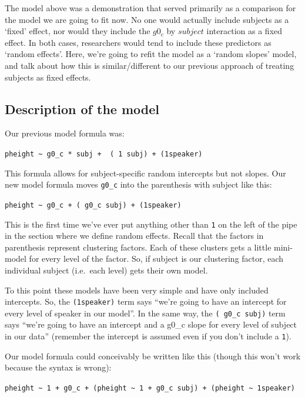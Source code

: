 \documentclass[
]{book}
\begin{document}
The model above was a demonstration that served primarily as a comparison for the model we are going to fit now. No one would actually include subjects as a `fixed' effect, nor would they include the \(g0_c\) by \(subject\) interaction as a fixed effect. In both cases, researchers would tend to include these predictors as `random effects'. Here, we're going to refit the model as a `random slopes' model, and talk about how this is similar/different to our previous approach of treating subjects as fixed effects.

\hypertarget{description-of-the-model-8}{%
\subsection{Description of the model}\label{description-of-the-model-8}}

Our previous model formula was:

\texttt{pheight\ \textasciitilde{}\ g0\_c\ *\ subj\ +\ \ (\ 1\ \textbar{}subj)\ +\ (1\textbar{}speaker)}

This formula allows for subject-specific random intercepts but not slopes. Our new model formula moves \texttt{g0\_c} into the parenthesis with subject like this:

\texttt{pheight\ \textasciitilde{}\ g0\_c\ +\ (\ g0\_c\ \textbar{}subj)\ +\ (1\textbar{}speaker)}

This is the first time we've ever put anything other than \texttt{1} on the left of the pipe in the section where we define random effects. Recall that the factors in parenthesis represent clustering factors. Each of these clusters gets a little mini-model for every level of the factor. So, if subject is our clustering factor, each individual subject (i.e.~each level) gets their own model.

To this point these models have been very simple and have only included intercepts. So, the \texttt{(1\textbar{}speaker)} term says ``we're going to have an intercept for every level of speaker in our model''. In the same way, the \texttt{(\ g0\_c\ \textbar{}subj)} term says ``we're going to have an intercept and a g0\_c slope for every level of subject in our data'' (remember the intercept is assumed even if you don't include a \texttt{1}).

Our model formula could conceivably be written like this (though this won't work because the syntax is wrong):

\texttt{pheight\ \textasciitilde{}\ 1\ +\ g0\_c\ +\ (pheight\ \textasciitilde{}\ 1\ +\ g0\_c\ \textbar{}subj)\ +\ (pheight\ \textasciitilde{}\ 1\textbar{}speaker)}
\end{document}
